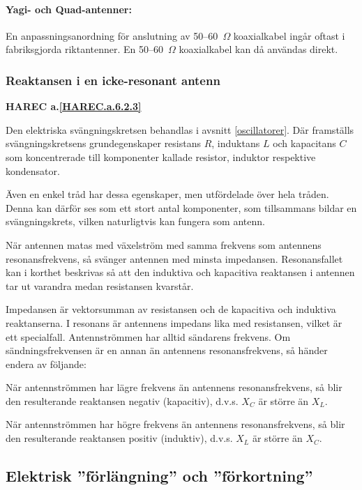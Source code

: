 \paragraph{Yagi- och Quad-antenner:}

En anpassningsanordning för anslutning av 50--60~\(\Omega\) koaxialkabel ingår
oftast i fabriksgjorda riktantenner.
En 50--60~\(\Omega\) koaxialkabel kan då användas direkt.

\subsubsection{Reaktansen i en icke-resonant antenn}
\textbf{
HAREC a.\ref{HAREC.a.6.2.3}\label{myHAREC.a.6.2.3}
}

Den elektriska svängningskretsen behandlas i avsnitt \ref{oscillatorer}.
Där framställs svängningskretsens grundegenskaper resistans \(R\),
induktans \(L\) och kapacitans \(C\) som koncentrerade till komponenter kallade
resistor, induktor respektive kondensator.

Även en enkel tråd har dessa egenskaper, men utfördelade över hela tråden.
Denna kan därför ses som ett stort antal komponenter, som tillsammans bildar en
svängningskrets, vilken naturligtvis kan fungera som antenn.

När antennen matas med växelström med samma frekvens som antennens
resonansfrekvens, så svänger antennen med minsta impedansen.
Resonansfallet kan i korthet beskrivas så att den induktiva och kapacitiva
reaktansen i antennen tar ut varandra medan resistansen kvarstår.

Impedansen är vektorsumman av resistansen och de kapacitiva och
induktiva reaktanserna.
I resonans är antennens impedans lika med resistansen, vilket är ett
specialfall.
Antennströmmen har alltid sändarens frekvens.
Om sändningsfrekvensen är en annan än antennens resonansfrekvens, så händer
endera av följande:

När antennströmmen har lägre frekvens än antennens resonansfrekvens, så blir
den resulterande reaktansen negativ (kapacitiv), d.v.s. \(X_C\) är större
än \(X_L\).

När antennströmmen har högre frekvens än antennens resonansfrekvens,
så blir den resulterande reaktansen positiv (induktiv), d.v.s. \(X_L\)
är större än \(X_C\).

\subsection{Elektrisk ''förlängning'' och ''förkortning''}

